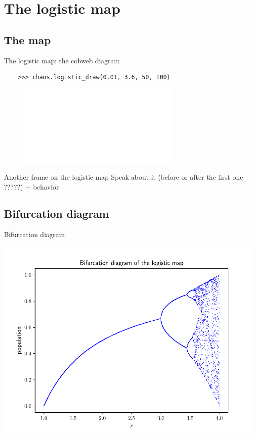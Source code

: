 \documentclass[11pt, compress]{beamer}
\theoremstyle{definition}
\begin{document}
\section[Logistic map]{The logistic map}
\subsection{The map}

\begin{frame}[fragile]{The logistic map: the cobweb diagram}
\begin{verbatim}
	>>> chaos.logistic_draw(0.01, 3.6, 50, 100)
\end{verbatim}
\vspace{-.75cm}
\begin{figure}[H]
\begin{center}
    \includegraphics<2>[scale=0.55]{logistic_cobweb.pdf}
\end{center}
\end{figure}
\end{frame}

\begin{frame}{Another frame on the logistic map}
Speak about it (before or after the first one ?????) + behavior
\end{frame}

\subsection{Bifurcation diagram}
\begin{frame}{Bifurcation diagram}
\begin{center}
    \includegraphics[scale=0.6]{bifurcation.pdf}
\end{center}
\end{frame}
\end{document}
